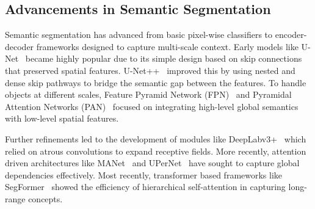 \subsection{Advancements in Semantic Segmentation}
\label{sec:adv-sem-seg}
Semantic segmentation has advanced from basic pixel-wise classifiers to encoder-decoder frameworks designed to capture multi-scale context. Early models like U-Net~\cite{ronneberger2015unet} became highly popular due to its simple design based on skip connections that preserved spatial features. U-Net++~\cite{zhou2019unetplusplus} improved this by using nested and dense skip pathways to bridge the semantic gap between the features. To handle objects at different scales, Feature Pyramid Network (FPN)~\cite{DBLP:journals/corr/LinDGHHB16} and Pyramidal Attention Networks (PAN)~\cite{DBLP:journals/corr/abs-1805-10180} focused on integrating high-level global semantics with low-level spatial features.

Further refinements led to the development of modules like DeepLabv3+~\cite{DBLP:journals/corr/abs-1802-02611} which relied on atrous convolutions to expand receptive fields. More recently, attention driven architectures like MANet~\cite{Li_2022} and UPerNet~\cite{DBLP:journals/corr/abs-1807-10221} have sought to capture global dependencies effectively. Most recently, transformer based frameworks like SegFormer~\cite{xie2021segformer} showed the efficiency of hierarchical self-attention in capturing long-range concepts.

